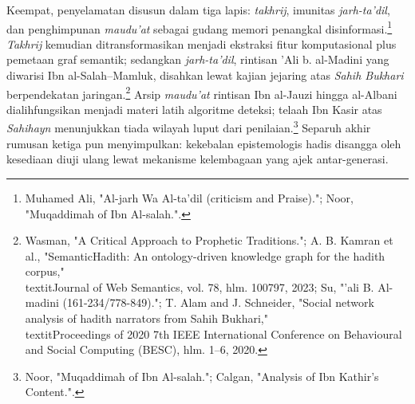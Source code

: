 Keempat, penyelamatan disusun dalam tiga lapis: \textit{takhrij}, imunitas \textit{jarh-ta'dil}, dan penghimpunan \textit{maudu'at} sebagai gudang memori penangkal disinformasi.\footnote{Muhamed Ali, "Al-jarh Wa Al-ta'dil (criticism and Praise)."; Noor, "Muqaddimah of Ibn Al-salah.".} \textit{Takhrij} kemudian ditransformasikan menjadi ekstraksi fitur komputasional plus pemetaan graf semantik; sedangkan \textit{jarh-ta'dil}, rintisan 'Ali b. al-Madini yang diwarisi Ibn al-Salah--Mamluk, disahkan lewat kajian jejaring atas \textit{Sahih Bukhari} berpendekatan jaringan.\footnote{Wasman, "A Critical Approach to Prophetic Traditions."; A. B. Kamran et al., "SemanticHadith: An ontology-driven knowledge graph for the hadith corpus," \\textit{Journal of Web Semantics}, vol. 78, hlm. 100797, 2023; Su, "'ali B. Al-madini (161-234/778-849)."; T. Alam and J. Schneider, "Social network analysis of hadith narrators from Sahih Bukhari," \\textit{Proceedings of 2020 7th IEEE International Conference on Behavioural and Social Computing (BESC)}, hlm. 1--6, 2020.} Arsip \textit{maudu'at} rintisan Ibn al-Jauzi hingga al-Albani dialihfungsikan menjadi materi latih algoritme deteksi; telaah Ibn Kasir atas \textit{Sahihayn} menunjukkan tiada wilayah luput dari penilaian.\footnote{Noor, "Muqaddimah of Ibn Al-salah."; Calgan, "Analysis of Ibn Kathir's Content.".} Separuh akhir rumusan ketiga pun menyimpulkan: kekebalan epistemologis hadis disangga oleh kesediaan diuji ulang lewat mekanisme kelembagaan yang ajek antar-generasi.

